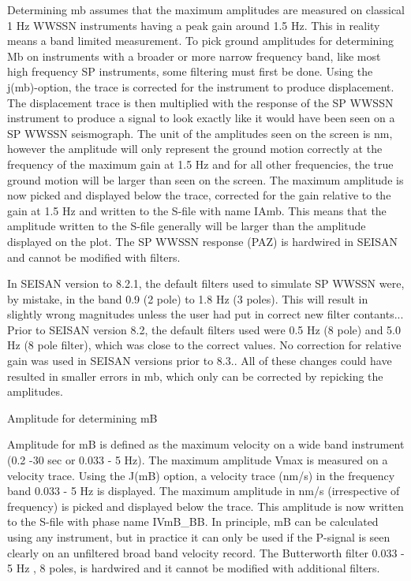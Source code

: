Determining mb assumes that the maximum amplitudes are measured on classical 1 Hz WWSSN instruments having a peak gain around 1.5 Hz. This in reality means a band limited measurement.  To pick ground amplitudes for determining Mb on instruments with a broader or more narrow frequency band, like most high frequency SP instruments, some filtering must first be done. Using the j(mb)-option, the trace is corrected for the instrument to produce displacement. The displacement trace is then multiplied with the response of the SP WWSSN instrument to produce a signal to look exactly like it would have been seen on a SP WWSSN seismograph. The unit of the amplitudes seen on the screen is nm, however the amplitude will only represent the ground motion correctly at the frequency of the maximum gain at 1.5 Hz and for all other frequencies, the true ground motion will be larger than seen on the screen. The maximum amplitude is now picked and displayed below the trace, corrected for the gain relative to the gain at 1.5 Hz and written to the S-file with name IAmb. This means that the amplitude written to the S-file generally will be larger than the amplitude displayed on the plot. The SP WWSSN response (PAZ) is hardwired in SEISAN and cannot be modified with filters.

In SEISAN version to 8.2.1, the default filters used to simulate SP WWSSN were, by mistake, in the band 0.9 (2 pole) to 1.8 Hz (3 poles). This will result in slightly wrong magnitudes unless the user had put in correct new filter contants... Prior to SEISAN version 8.2, the default filters used were 0.5 Hz (8 pole)  and  5.0 Hz (8 pole filter), which was close to the correct values. No correction for relative gain was used in SEISAN versions prior to 8.3.. All of these changes could have resulted in smaller errors in mb, which only can be corrected by repicking the amplitudes.

Amplitude for determining mB

Amplitude for mB is defined as the maximum velocity on a wide band instrument (0.2 -30 sec or 0.033 - 5 Hz). The maximum amplitude Vmax is measured on a velocity trace. Using the J(mB) option, a velocity trace (nm/s) in the frequency band 0.033 - 5 Hz is displayed. The maximum amplitude in nm/s (irrespective of frequency) is picked and displayed below the trace. This amplitude is now written to the S-file with phase name IVmB\_BB. In principle, mB can be calculated using any instrument, but in practice it can only be used if the P-signal is seen clearly on an unfiltered broad band velocity record.
The Butterworth filter 0.033 - 5 Hz , 8 poles, is hardwired and it cannot be modified with additional filters.

